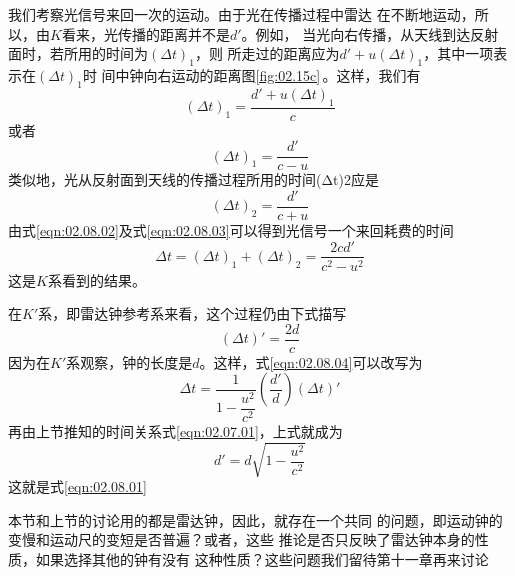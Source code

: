 我们考察光信号来回一次的运动。由于光在传播过程中雷达
在不断地运动，所以，由$K$看来，光传播的距离并不是$d'$。例如，
当光向右传播，从天线到达反射面时，若所用的时间为$(\Delta t)_1$，则
所走过的距离应为$ d ' + u ( \Delta t ) _ { 1 }$，其中一项表示在$(\Delta t)_1$时
间中钟向右运动的距离\lhbrak 图\ref{fig:02.15c}\,\rhbrak 。这样，我们有
\begin{equation*}
    ( \Delta t ) _ { 1 } = \frac { d ' + u (\Delta t)_1 } { c }
\end{equation*}
或者
\begin{equation}\label{eqn:02.08.02}
    ( \Delta t ) _ { 1 } = \frac { d ' } { c - u }
\end{equation}
类似地，光从反射面到天线的传播过程所用的时间(Δt)2应是
\begin{equation}\label{eqn:02.08.03}
    ( \Delta t ) _ { 2 } = \frac { d ' } { c + u }
\end{equation}
由式\eqref{eqn:02.08.02}及式\eqref{eqn:02.08.03}可以得到光信号一个来回耗费的时间
\begin{equation}\label{eqn:02.08.04}
    \Delta t = ( \Delta t ) _ { 1 } + ( \Delta t ) _ { 2 } =  \frac { 2 c d ' } { c ^ { 2 } - u ^ { 2 } }
\end{equation}
这是$K$系看到的结果。

在$K'$系，即雷达钟参考系来看，这个过程仍由下式描写
\begin{equation*}
    ( \Delta t ) ' = \frac { 2 d } { c }
\end{equation*}
因为在$K'$系观察，钟的长度是$d$。这样，式\eqref{eqn:02.08.04}可以改写为
\begin{equation*}
    \Delta t = \frac { 1 } { 1 - \dfrac { u ^ { 2 } } { c ^ { 2 } } } \left ( \frac { d ' } { d } \right) \left( \Delta t \right) '
\end{equation*}
再由上节推知的时间关系式\eqref{eqn:02.07.01}，上式就成为
\begin{equation*}
    d ' = d \sqrt { 1 - \frac { u ^ { 2 } } { c ^ { 2 } } }
\end{equation*}
\clearpage
\noindent 这就是式\eqref{eqn:02.08.01}

本节和上节的讨论用的都是雷达钟，因此，就存在一个共同
的问题，即运动钟的变慢和运动尺的变短是否普遍？或者，这些
推论是否只反映了雷达钟本身的性质，如果选择其他的钟有没有
这种性质？这些问题我们留待第十一章再来讨论
